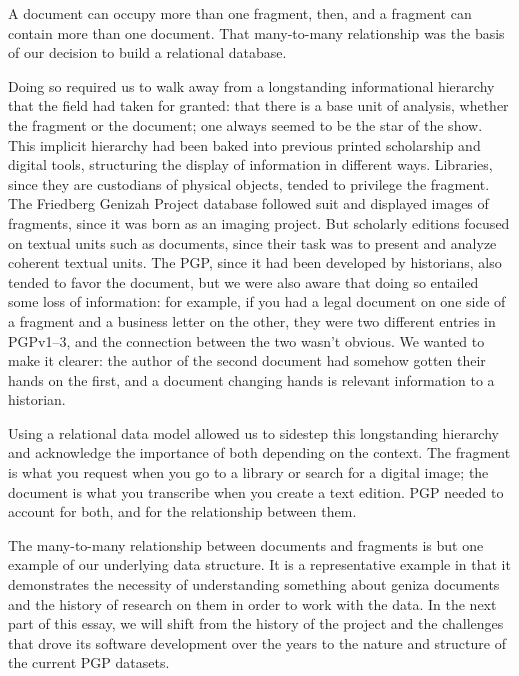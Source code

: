 \documentclass{article}
\begin{document}
A document can occupy more than one fragment, then, and a fragment can contain more than one document. That many-to-many relationship was the basis of our decision to build a relational database. 

Doing so required us to walk away from a longstanding informational hierarchy that the field had taken for granted: that there is a base unit of analysis, whether the fragment or the document; one always seemed to be the star of the show. This implicit hierarchy had been baked into previous printed scholarship and digital tools, structuring the display of information in different ways. Libraries, since they are custodians of physical objects, tended to privilege the fragment. The Friedberg Genizah Project database followed suit and displayed images of fragments, since it was born as an imaging project. But scholarly editions focused on textual units such as documents, since their task was to present and analyze coherent textual units. The PGP, since it had been developed by historians, also tended to favor the document, but we were also aware that doing so entailed some loss of information: for example, if you had a legal document on one side of a fragment and a business letter on the other, they were two different entries in PGPv1–3, and the connection between the two wasn’t obvious. We wanted to make it clearer: the author of the second document had somehow gotten their hands on the first, and a document changing hands is relevant information to a historian. 

Using a relational data model allowed us to sidestep this longstanding hierarchy and acknowledge the importance of both depending on the context. The fragment is what you request when you go to a library or search for a digital image; the document is what you transcribe when you create a text edition. PGP needed to account for both, and for the relationship between them. 


The many-to-many relationship between documents and fragments is but one example of our underlying data structure. It is a representative example in that it demonstrates the necessity of understanding something about geniza documents and the history of research on them in order to work with the data. In the next part of this essay, we will shift from the history of the project and the challenges that drove its software development over the years to the nature and structure of the current PGP datasets.
\end{document}
